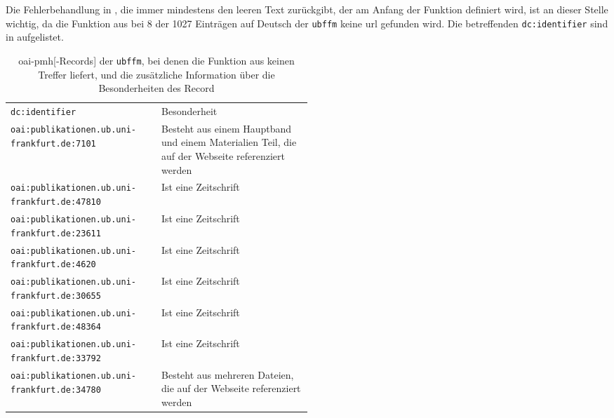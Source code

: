 Die Fehlerbehandlung in ,
die immer mindestens den leeren Text zurückgibt,
der am Anfang der Funktion definiert wird,
ist an dieser Stelle wichtig,
da die Funktion aus 
bei 8 der 1027 Einträgen auf Deutsch der \texttt{ubffm}
keine \gls{url} gefunden wird.
Die betreffenden \texttt{dc:identifier} sind in 
aufgelistet.

\begin{table}
	\begin{tabularx}{\textwidth}{l p{0.5\linewidth}}
		\texttt{dc:identifier}                               & Besonderheit                                                                                          \\
		\texttt{oai:publikationen.ub.uni-frankfurt.de:7101}  & Besteht aus einem Hauptband und einem Materialien Teil, die auf der Webseite referenziert werden \\
		\texttt{oai:publikationen.ub.uni-frankfurt.de:47810} & Ist eine Zeitschrift                                                                             \\
		\texttt{oai:publikationen.ub.uni-frankfurt.de:23611} & Ist eine Zeitschrift                                                                             \\
		\texttt{oai:publikationen.ub.uni-frankfurt.de:4620}  & Ist eine Zeitschrift                                                                             \\
		\texttt{oai:publikationen.ub.uni-frankfurt.de:30655} & Ist eine Zeitschrift                                                                             \\
		\texttt{oai:publikationen.ub.uni-frankfurt.de:48364} & Ist eine Zeitschrift                                                                             \\
		\texttt{oai:publikationen.ub.uni-frankfurt.de:33792} & Ist eine Zeitschrift                                                                             \\
		\texttt{oai:publikationen.ub.uni-frankfurt.de:34780} & Besteht aus mehreren Dateien, die auf der Webseite referenziert werden                           \\
	\end{tabularx}
	\caption{\gls{oai-pmh}[-Records] der \texttt{ubffm},
		bei denen die Funktion aus  keinen Treffer liefert,
		und die zusätzliche Information über die Besonderheiten des Record
	}
	\label{tbl:find_pdf_urls:failed}
\end{table}



